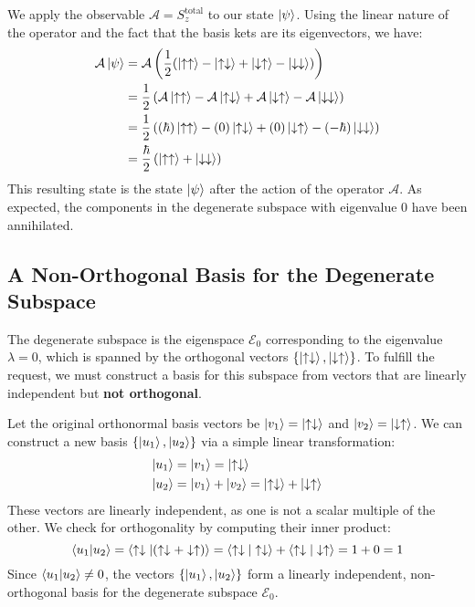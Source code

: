 \documentclass[11pt,a4paper]{article}
\begin{document}
We apply the observable $\mathcal{A} = S_z^{\text{total}}$ to our state $\ket{\psi}$. Using the linear nature of the operator and the fact that the basis kets are its eigenvectors, we have:
\begin{align}
    \mathcal{A}\ket{\psi} &= \mathcal{A} \left( \frac{1}{2} (\ket{\uparrow\uparrow} - \ket{\uparrow\downarrow} + \ket{\downarrow\uparrow} - \ket{\downarrow\downarrow}) \right) \nonumber \\
    &= \frac{1}{2} \left( \mathcal{A}\ket{\uparrow\uparrow} - \mathcal{A}\ket{\uparrow\downarrow} + \mathcal{A}\ket{\downarrow\uparrow} - \mathcal{A}\ket{\downarrow\downarrow} \right) \nonumber \\
    &= \frac{1}{2} \left( (\hbar)\ket{\uparrow\uparrow} - (0)\ket{\uparrow\downarrow} + (0)\ket{\downarrow\uparrow} - (-\hbar)\ket{\downarrow\downarrow} \right) \nonumber \\
    &= \frac{\hbar}{2} \left( \ket{\uparrow\uparrow} + \ket{\downarrow\downarrow} \right)
\end{align}
This resulting state is the state $\ket{\psi}$ after the action of the operator $\mathcal{A}$. As expected, the components in the degenerate subspace with eigenvalue 0 have been annihilated.

\subsection{A Non-Orthogonal Basis for the Degenerate Subspace}

The degenerate subspace is the eigenspace $\mathcal{E}_0$ corresponding to the eigenvalue $\lambda=0$, which is spanned by the orthogonal vectors $\{\ket{\uparrow\downarrow}, \ket{\downarrow\uparrow}\}$. To fulfill the request, we must construct a basis for this subspace from vectors that are linearly independent but \textbf{not orthogonal}.

Let the original orthonormal basis vectors be $\ket{v_1} = \ket{\uparrow\downarrow}$ and $\ket{v_2} = \ket{\downarrow\uparrow}$. We can construct a new basis $\{\ket{u_1}, \ket{u_2}\}$ via a simple linear transformation:
\begin{align}
    \ket{u_1} &= \ket{v_1} = \ket{\uparrow\downarrow} \\
    \ket{u_2} &= \ket{v_1} + \ket{v_2} = \ket{\uparrow\downarrow} + \ket{\downarrow\uparrow}
\end{align}
These vectors are linearly independent, as one is not a scalar multiple of the other. We check for orthogonality by computing their inner product:
\begin{equation}
    \braket{u_1 | u_2} = \braket{\uparrow\downarrow | (\uparrow\downarrow + \downarrow\uparrow)} = \braket{\uparrow\downarrow | \uparrow\downarrow} + \braket{\uparrow\downarrow | \downarrow\uparrow} = 1 + 0 = 1
\end{equation}
Since $\braket{u_1 | u_2} \neq 0$, the vectors $\{\ket{u_1}, \ket{u_2}\}$ form a linearly independent, non-orthogonal basis for the degenerate subspace $\mathcal{E}_0$.
\end{document}

